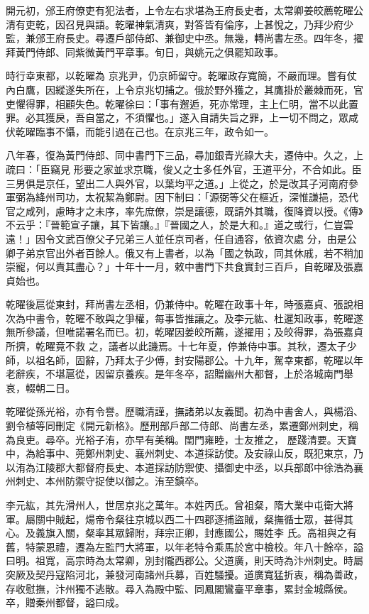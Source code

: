 \begin{pinyinscope}
 開元初，邠王府僚吏有犯法者，上令左右求堪為王府長史者，太常卿姜皎薦乾曜公清有吏乾，因召見與語。乾曜神氣清爽，對答皆有倫序，上甚悅之，乃拜少府少監，兼邠王府長史。尋遷戶部侍郎、兼御史中丞。無幾，轉尚書左丞。四年冬，擢拜黃門侍郎、同紫微黃門平章事。旬日，與姚元之俱罷知政事。



 時行幸東都，以乾曜為
 京兆尹，仍京師留守。乾曜政存寬簡，不嚴而理。嘗有仗內白鷹，因縱遂失所在，上令京兆切捕之。俄於野外獲之，其鷹掛於叢棘而死，官吏懼得罪，相顧失色。乾曜徐曰：「事有邂逅，死亦常理，主上仁明，當不以此置罪。必其獲戾，吾自當之，不須懼也。」遂入自請失旨之罪，上一切不問之，眾咸伏乾曜臨事不懾，而能引過在己也。在京兆三年，政令如一。



 八年春，復為黃門侍郎、同中書門下三品，尋加銀青光祿大夫，遷侍中。久之，上疏曰：「臣竊見
 形要之家並求京職，俊乂之士多任外官，王道平分，不合如此。臣三男俱是京任，望出二人與外官，以葉均平之道。」上從之，於是改其子河南府參軍弼為絳州司功，太祝絜為鄭尉。因下制曰：「源弼等父在樞近，深惟謙挹，恐代官之咸列，慮時才之未序，率先庶僚，崇是讓德，既請外其職，復降資以授。《傳》不云乎：『晉範宣子讓，其下皆讓。』『晉國之人，於是大和。』道之或行，仁豈雲遠！」因令文武百僚父子兄弟三人並任京司者，任自通容，依資次處
 分，由是公卿子弟京官出外者百餘人。俄又有上書者，以為「國之執政，同其休戚，若不稍加崇寵，何以責其盡心？」十年十一月，敕中書門下共食實封三百戶，自乾曜及張嘉貞始也。



 乾曜後扈從東封，拜尚書左丞相，仍兼侍中。乾曜在政事十年，時張嘉貞、張說相次為中書令，乾曜不敢與之爭權，每事皆推讓之。及李元紘、杜暹知政事，乾曜遂無所參議，但唯諾署名而已。初，乾曜因姜皎所薦，遂擢用；及皎得罪，為張嘉貞所擠，乾曜竟不救
 之，議者以此譏焉。十七年夏，停兼侍中事。其秋，遷太子少師，以祖名師，固辭，乃拜太子少傅，封安陽郡公。十九年，駕幸東都，乾曜以年老辭疾，不堪扈從，因留京養疾。是年冬卒，詔贈幽州大都督，上於洛城南門舉哀，輟朝二日。



 乾曜從孫光裕，亦有令譽。歷職清謹，撫諸弟以友義聞。初為中書舍人，與楊滔、劉令植等同刪定《開元新格》。歷刑部戶部二侍郎、尚書左丞，累遷鄭州刺史，稱為良吏。尋卒。光裕子洧，亦早有美稱。閨門雍睦，士友推之，
 歷踐清要。天寶中，為給事中、蔸鄭州刺史、襄州刺史、本道採訪使。及安祿山反，既犯東京，乃以洧為江陵郡大都督府長史、本道採訪防禦使、攝御史中丞，以兵部郎中徐浩為襄州刺史、本州防禦守捉使以御之。洧至鎮卒。



 李元紘，其先滑州人，世居京兆之萬年。本姓丙氏。曾祖粲，隋大業中屯衛大將軍。屬關中賊起，煬帝令粲往京城以西二十四郡逐捕盜賊，粲撫循士眾，甚得其心。及義旗入關，粲率其眾歸附，拜宗正卿，封應國公，賜姓李
 氏。高祖與之有舊，特蒙恩禮，遷為左監門大將軍，以年老特令乘馬於宮中檢校。年八十餘卒，謚曰明。祖寬，高宗時為太常卿，別封隴西郡公。父道廣，則天時為汴州刺史。時屬突厥及契丹寇陷河北，兼發河南諸州兵募，百姓騷擾。道廣寬猛折衷，稱為善政，存收慰撫，汴州獨不逃散。尋入為殿中監、同鳳閣鸞臺平章事，累封金城縣侯。卒，贈秦州都督，謚曰成。




\end{pinyinscope}
